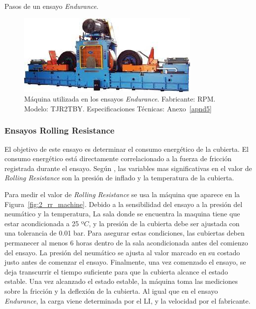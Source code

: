 \begin{table}
	\centering
	\caption{Pasos de un ensayo \textit{Endurance}.}
	
	\label{tab:1_tbl_qced_steps}
\end{table}

\begin{figure}[H]
	\begin{center}
		\includegraphics[width=\textwidth]{fig/2_endurance_machine}
	\end{center}
	\caption{Máquina utilizada en los ensayos \textit{Endurance}. 
	Fabricante: RPM. Modelo: TJR2TBY. Especificaciones Técnicas: Anexo~\ref{apnd5}}
	\label{fig:2_endurance_machine}
\end{figure}

\subsubsection{Ensayos Rolling Resistance}
El objetivo de este ensayo es determinar el consumo energético de la cubierta.
El consumo energético está directamente correlacionado
a la fuerza de fricción registrada durante el ensayo.
Según \citet{ydrefors2021rolling}, las variables mas significativas en el valor de \textit{Rolling Resistance} son la presión de inflado y la temperatura de la cubierta.

Para medir el valor de \textit{Rolling Resistance}
se usa la máquina que aparece en la Figura~\ref{fig:2_rr_machine}.
Debido a la sensibilidad del ensayo
a la presión del neumático y la temperatura,
La sala donde se encuentra la maquina tiene que estar acondicionada a 25 º$C$,
y la presión de la cubierta debe ser ajustada con una tolerancia de 0.01 bar.
Para asegurar estas condiciones, las cubiertas deben permanecer
al menos 6 horas dentro de la sala acondicionada antes del comienzo del ensayo.
La presión del neumático se ajusta al
valor marcado en su costado justo antes de comenzar el ensayo.
Finalmente, una vez comenzado el ensayo, se deja transcurrir
el tiempo suficiente para que la cubierta alcance el estado estable.
Una vez alcanzado el estado estable, la máquina toma las mediciones
sobre la fricción y la deflexión de la cubierta.
Al igual que en el ensayo \textit{Endurance}, la carga viene determinada por el LI, y la velocidad por el fabricante.

